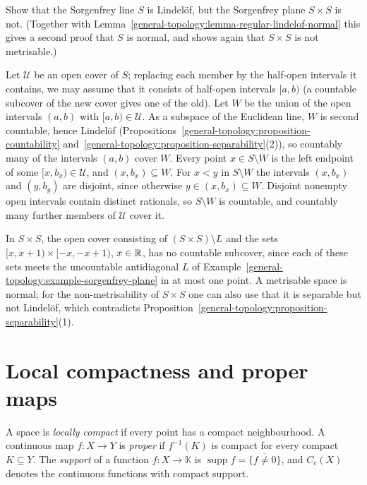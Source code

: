 \begin{exercise}\label{general-topology:exercise-sorgenfrey-lindelof}
Show that the Sorgenfrey line $S$ is Lindel\"of, but the Sorgenfrey plane $S \times S$ is not. (Together with Lemma~\ref{general-topology:lemma-regular-lindelof-normal} this gives a second proof that $S$ is
normal, and shows again that $S \times S$ is not metrisable.)
\end{exercise}

\begin{solution}
Let $\mathcal{U}$ be an open cover of $S$; replacing each member by the half-open intervals it contains, we may assume that it consists of half-open intervals $[a, b)$ (a countable subcover of
the new cover gives one of the old). Let $W$ be the union of the open intervals $(a, b)$ with $[a, b) \in \mathcal{U}$. As a subspace of the
Euclidean line, $W$ is second countable, hence Lindel\"of (Propositions~\ref{general-topology:proposition-countability} and~\ref{general-topology:proposition-separability}(2)), so countably many of the
intervals $(a, b)$ cover $W$. Every point $x \in S \setminus W$ is the left endpoint of some $[x, b_x) \in \mathcal{U}$, and $(x, b_x) \subseteq W$. For $x < y$ in $S \setminus W$ the intervals $(x, b_x)$ and
$(y, b_y)$ are disjoint, since otherwise $y \in (x, b_x) \subseteq W$. Disjoint nonempty open intervals contain distinct rationals, so $S \setminus W$ is countable, and countably many further members of
$\mathcal{U}$ cover it.

In $S \times S$, the open cover consisting of $(S \times S) \setminus L$ and the sets $[x, x + 1) \times [-x, -x + 1)$, $x \in \mathbb{R}$, has no countable subcover, since each of these sets meets the uncountable antidiagonal
$L$ of Example~\ref{general-topology:example-sorgenfrey-plane} in at most one point. A metrisable space is normal; for the non-metrisability of $S \times S$ one can also use that it is separable but not Lindel\"of,
which contradicts Proposition~\ref{general-topology:proposition-separability}(1).
\end{solution}

\section{Local compactness and proper maps}\label{general-topology:section-local-compactness}

\begin{definition}\label{general-topology:definition-locally-compact}
A space is \emph{locally compact} if every point has a compact neighbourhood. A continuous map $f \colon X \to Y$ is \emph{proper} if $f^{-1}(K)$ is
compact for every compact $K \subseteq Y$. The \emph{support} of a function $f \colon X \to \mathbb{K}$ is $\operatorname{supp} f = \overline{\{f \neq 0\}}$, and
$C_c(X)$ denotes the continuous functions with compact support.
\end{definition}

